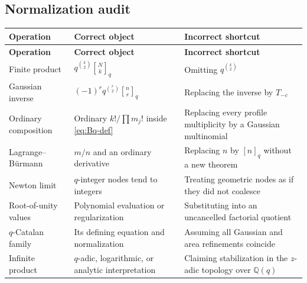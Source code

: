 \documentclass[11pt,a4paper]{article}
\numberwithin{equation}{section}
\theoremstyle{definition}
\theoremstyle{remark}
\newcommand{\Q}{\mathbb Q}
\newcommand{\qb}[2]{\genfrac{[}{]}{0pt}{}{#1}{#2}_{q}}
\newcommand{\qi}[1]{[#1]_{q}}
\begin{document}
\subsection{Normalization audit}
\begin{longtable}{@{}>{\RaggedRight\arraybackslash}p{}>{\RaggedRight\arraybackslash}p{}>{\RaggedRight\arraybackslash}p{}@{}}
\toprule
\textbf{Operation} & \textbf{Correct object} & \textbf{Incorrect shortcut}\\
\midrule
\endfirsthead
\toprule
\textbf{Operation} & \textbf{Correct object} & \textbf{Incorrect shortcut}\\
\midrule
\endhead
Finite product & $q^{\binom k2}\qb Nk$ & Omitting $q^{\binom k2}$\\[1mm]
Gaussian inverse & $(-1)^r q^{\binom r2}\qb nr$ & Replacing the inverse by $T_{-c}$\\[1mm]
Ordinary composition & Ordinary $k!/\prod m_j!$ inside \eqref{eq:Bq-def} & Replacing every profile multiplicity by a Gaussian multinomial\\[1mm]
Lagrange--B\"urmann & $m/n$ and an ordinary derivative & Replacing $n$ by $\qi n$ without a new theorem\\[1mm]
Newton limit & $q$-integer nodes tend to integers & Treating geometric nodes as if they did not coalesce\\[1mm]
Root-of-unity values & Polynomial evaluation or regularization & Substituting into an uncancelled factorial quotient\\[1mm]
$q$-Catalan family & Its defining equation and normalization & Assuming all Gaussian and area refinements coincide\\[1mm]
Infinite product & $q$-adic, logarithmic, or analytic interpretation & Claiming stabilization in the $z$-adic topology over $\Q(q)$\\
\bottomrule
\end{longtable}
\end{document}
